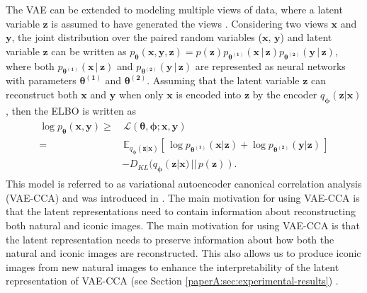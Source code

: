 The VAE can be extended to modeling multiple views of data, where a latent variable $\mathbf{z}$ is assumed to have generated the views . Considering two views $\mathbf{x}$ and $\mathbf{y}$, the joint distribution over the paired random variables ($\mathbf{x}$, $\mathbf{y}$) and latent variable $\mathbf{z}$ can be written as $p_{\boldsymbol{\theta}}(\mathbf{x}, \mathbf{y}, \mathbf{z}) = p(\mathbf{z})p_{\boldsymbol{\theta^{(1)}}}(\mathbf{x}\,|\,\mathbf{z})p_{\boldsymbol{\theta^{(2)}}}(\mathbf{y}\,|\,\mathbf{z})$, where both $p_{\boldsymbol{\theta^{(1)}}}(\mathbf{x}\,|\,\mathbf{z})$ and $p_{\boldsymbol{\theta^{(2)}}}(\mathbf{y}\,|\,\mathbf{z})$ are represented as neural networks with parameters $\boldsymbol{\theta^{(1)}}$ and $\boldsymbol{\theta^{(2)}}$. Assuming that the latent variable $\mathbf{z}$ can reconstruct both $\mathbf{x}$ and $\mathbf{y}$ when only $\mathbf{x}$ is encoded into $\mathbf{z}$ by the encoder $q_{\boldsymbol{\phi}}(\mathbf{z}|\mathbf{x})$, then the ELBO is written as 
\begin{align}
\begin{split}\label{eq:vcca-loss}
\log p_{\boldsymbol{\theta}}(\mathbf{x}, \mathbf{y}) \geq & \, \mathcal{L}(\boldsymbol{\theta}, \boldsymbol{\phi}; \mathbf{x}, \mathbf{y}) \\ 
= & \,  \mathbb{E}_{q_{\boldsymbol{\phi}}(\mathbf{z}|\mathbf{x})}\left[\, \log p_{\boldsymbol{\theta^{(1)}}}(\mathbf{x} | \mathbf{z}) + \log p_{\boldsymbol{\theta^{(2)}}}(\mathbf{y} | \mathbf{z}) \,\right] \\ 
& -D_{KL}(q_{\boldsymbol{\phi}}(\mathbf{z}|\mathbf{x})\,||\,p(\mathbf{z})) .
\end{split}
\end{align}  
This model is referred to as variational autoencoder canonical correlation analysis (VAE-CCA) and was introduced in . The main motivation for using VAE-CCA is that the latent representations need to contain information about reconstructing both natural and iconic images.
The main motivation for using VAE-CCA is that 
the latent representation needs to preserve information about how both the natural and iconic images are reconstructed. This also allows us to produce iconic images from new natural images to enhance the interpretability of the latent representation of VAE-CCA (see Section \ref{paperA:sec:experimental-results}) .

	
